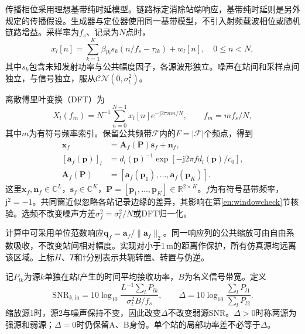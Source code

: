 \documentclass[a4paper,fleqn]{cas-sc}
\newcommand{\R}{\mathbb R}
\newcommand{\C}{\mathbb C}
\begin{document}
传播相位采用理想基带纯时延模型。链路标定消除站端响应，基带纯时延则是另外规定的传播假设。生成器与定位器使用同一基带模型，不引入射频载波相位或随机链路增益。采样率为$f_s$、记录为$N$点时，
\begin{equation}
x_l[n]=\sum_{k=1}^K\beta_{lk}s_k(n/f_s-\tau_{lk})+w_l[n],
\quad 0\le n<N,
\end{equation}
其中$s_k$包含未知发射功率与公共幅度因子，各源波形独立。噪声在站间和采样点间独立，与信号独立，服从$\mathcal{CN}(0,\sigma_t^2)$。

离散傅里叶变换（DFT）为
\begin{equation}
X_l(f_m)=N^{-1}\sum_{n=0}^{N-1}x_l[n]e^{-\mathrm j2\pi mn/N},
\qquad f_m=mf_s/N,
\label{en:dft}
\end{equation}
其中$m$为有符号频率索引。保留公共频带$\mathcal F$内的$F=|\mathcal F|$个频点，得到
\begin{align}
\bm x_f&=\bm A_f(\bm P)\bm s_f+\bm n_f,\label{en:frequency}\\
[\bm a_f(\bm p)]_l&=d_l(\bm p)^{-1}
 \exp[-\mathrm j2\pi f d_l(\bm p)/c_0],\label{en:response}\\
\bm A_f(\bm P)&=[\bm a_f(\bm p_1),\ldots,\bm a_f(\bm p_K)].\nonumber
\end{align}
这里$\bm x_f,\bm n_f\in\C^L$，$\bm s_f\in\C^K$，$\bm P=[\bm p_1,\ldots,\bm p_K]\in\R^{2\times K}$。$f$为有符号基带频率，$\mathrm j^2=-1$。共同窗近似忽略各站记录边缘的差异\cite{ChenHudsonYao2002}，其影响在第\ref{en:windowcheck}节核验。选频不改变噪声方差$\sigma_f^2=\sigma_t^2/N$或DFT归一化。

计算中可采用单位范数响应$\bm q_f=\bm a_f/\|\bm a_f\|_2$。同一响应列的公共缩放可由自由系数吸收，不改变站间相对幅度。实现对小于1\,m的距离作保护，所有仿真源均远离该区域。上标$H$、$T$和$\dagger$分别表示共轭转置、转置与伪逆。

记$P_{lk}$为源$k$单独在站$l$产生的时间平均接收功率，$B$为名义信号带宽。定义
\begin{equation}
\mathrm{SNR}_{k,\mathrm{in}}=10\log_{10}
 \frac{L^{-1}\sum_lP_{lk}}{\sigma_t^2 B/f_s},\qquad
\Delta=10\log_{10}\frac{\sum_lP_{l1}}{\sum_lP_{l2}}.
\label{en:snr}
\end{equation}
缩放源1时，源2与噪声保持不变，因此改变$\Delta$不改变弱源SNR。$\Delta>0$时称两源为强源和弱源；$\Delta=0$时仍保留A、B身份。单个站的局部功率差不必等于$\Delta$。

\FloatBarrier
\end{document}
